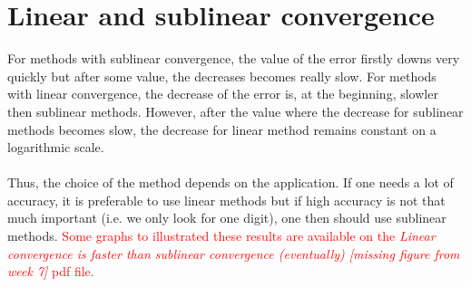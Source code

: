 \section{Linear and sublinear convergence}
 For methods with sublinear convergence, the value of the error firstly downs very quickly but after some value, the decreases becomes really slow. For methods with linear convergence, the decrease of the error is, at the beginning, slowler then sublinear methods. However, after the value where the decrease for sublinear methods becomes slow, the decrease for linear method remains constant on a logarithmic scale. \\ \\ Thus, the choice of the method depends on the application. If one needs a lot of accuracy, it is preferable to use linear methods but if high accuracy is not that much important (i.e. we only look for one digit), one then should use sublinear methods. \textcolor{red}{Some graphs to illustrated these results are available on the \textit{Linear convergence is faster than sublinear convergence (eventually) [missing figure from week 7]} pdf file.} 

